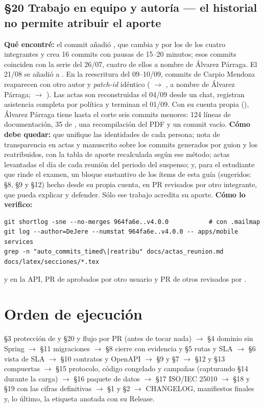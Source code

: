 \subsection*{\S20 Trabajo en equipo y autor\'ia --- el historial no permite atribuir el aporte}
\textbf{Qu\'e encontr\'e:} el commit  a\~nadi\'o , que cambia  y  por los de los cuatro integrantes y crea 16 commits con pausas de 15--20 minutos; esos commits coinciden con la serie del 26/07, cuatro de ellos a nombre de \'Alvarez P\'arraga. El 21/08 se a\~nadi\'o  a . En la reescritura del 09--10/09, commits de Carpio Mendoza reaparecen con otro autor y \emph{patch-id} id\'entico ( $\rightarrow$ , a nombre de \'Alvarez P\'arraga;  $\rightarrow$ ). Las actas son reconstruidas el 04/09 desde un chat, registran asistencia completa por pol\'itica y terminan el 01/09. Con su cuenta propia (), \'Alvarez P\'arraga tiene hasta el corte seis commits menores: 124 l\'ineas de documentaci\'on, 35 de , una recompilaci\'on del PDF y un commit vac\'io. \textbf{C\'omo debe quedar:}  que unifique las identidades de cada persona; nota de transparencia en actas y manuscrito sobre los commits generados por guion y los reatribuidos, con la tabla de aporte recalculada seg\'un ese m\'etodo; actas levantadas el d\'ia de cada reuni\'on del periodo del suspenso; y, para el estudiante que rinde el examen, un bloque sustantivo de los \'items de esta gu\'ia (sugeridos: \S8, \S9 y \S12) hecho desde su propia cuenta, en PR revisados por otro integrante, que pueda explicar y defender. S\'olo ese trabajo acredita su aporte. \textbf{C\'omo lo verifico:}\begin{verbatim}
git shortlog -sne --no-merges 964fa6e..v4.0.0           # con .mailmap
git log --author=DeJere --numstat 964fa6e..v4.0.0 -- apps/mobile services
grep -n "auto_commits_timed\|reatribu" docs/actas_reunion.md docs/latex/secciones/*.tex
\end{verbatim}
y en la API, PR de  aprobados por otro usuario y PR de otros revisados por .

\section{Orden de ejecuci\'on}
\S3 protecci\'on de  y \S20  y flujo por PR (antes de tocar nada) $\rightarrow$ \S4 dominio sin Spring $\rightarrow$ \S11 migraciones $\rightarrow$ \S8 cierre con evidencia y \S5 rutas y SLA $\rightarrow$ \S6 vista de SLA $\rightarrow$ \S10 contratos y OpenAPI $\rightarrow$ \S9 y \S7 $\rightarrow$ \S12 y \S13 compuertas $\rightarrow$ \S15 protocolo, c\'odigo congelado y campa\~nas (capturando \S14 durante la carga) $\rightarrow$ \S16 paquete de datos $\rightarrow$ \S17 ISO/IEC 25010 $\rightarrow$ \S18 y \S19 con las cifras definitivas $\rightarrow$ \S1 y \S2 $\rightarrow$ CHANGELOG, manifiestos finales y, lo \'ultimo, la etiqueta anotada con su Release.

